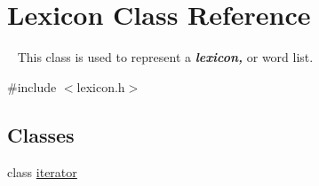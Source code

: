 \hypertarget{classLexicon}{}\section{Lexicon Class Reference}
\label{classLexicon}


~\newline
 This class is used to represent a {\bfseries {\itshape lexicon,}} or word list.  




{\ttfamily \#include $<$lexicon.\+h$>$}

\subsection*{Classes}
\begin{DoxyCompactItemize}
\item 
class \mbox{\hyperlink{classLexicon_1_1iterator}{iterator}}
\end{DoxyCompactItemize}

